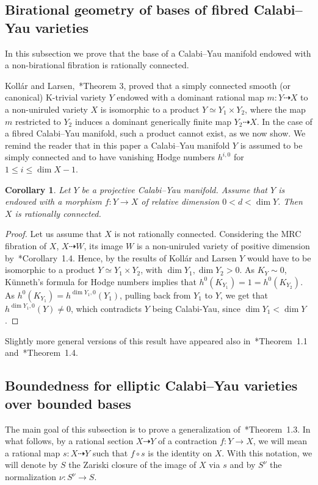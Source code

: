 \documentclass[11pt]{ip-journal}
\newtheorem{corollary}[theorem]{Corollary}
\theoremstyle{definition}
\begin{document}
\subsection{Birational geometry of bases of fibred Calabi--Yau varieties} \label{base.simply.cy.sect}

In this subsection we prove that the base of a Calabi--Yau manifold endowed with a non-birational fibration is rationally connected.

Koll\'ar and Larsen,~\cite{MR2641190}*{Theorem 3}, proved that a simply connected  smooth (or canonical) K-trivial variety $Y$ endowed with a dominant rational map $m \colon Y \dashrightarrow X$ to a non-uniruled variety $X$ is isomorphic to a product $Y \simeq Y_1 \times Y_2$, where the map $m$ restricted to $Y_2$ induces a dominant generically finite map 
$Y_2 \dashrightarrow X$.
In the case of a fibred Calabi--Yau manifold, such a product cannot exist, as we now show.
We remind the reader that in this paper a Calabi--Yau manifold 
$Y$ 
is assumed to be simply connected and to have vanishing Hodge numbers 
$h^{i, 0}$ 
for 
$1 \leq i \leq \dim X -1$.

\begin{corollary}\label{rc.base.cor}
Let $Y$ be a projective Calabi--Yau manifold. 
Assume that $Y$ is endowed with a morphism $f \colon Y \to X$ of relative dimension $0< d < \dim Y$.
Then $X$ is rationally connected.
\end{corollary}

\begin{proof}
Let us assume that 
$X$ 
is not rationally connected. 
Considering the MRC fibration of 
$X$, 
$X \dashrightarrow W$, 
its image 
$W$ 
is a non-uniruled variety of positive dimension by~\cite{GHS}*{Corollary~1.4}.
Hence, by the results of Koll\'ar and Larsen 
$Y$ 
would have to be isomorphic to a product 
$Y \simeq Y_1 \times Y_2$, 
with 
$\dim Y_1, \dim Y_2 >0$. 
As 
$K_Y\sim 0$, 
K\"unneth's formula for Hodge numbers implies that 
$h^0(K_{Y_1})=1=h^0(K_{Y_2})$.
As 
$h^0(K_{Y_1})=h^{\dim Y_1, 0}(Y_1)$, 
pulling back from 
$Y_1$ 
to 
$Y$, 
we get that 
$h^{\dim Y_1, 0}(Y) \neq 0$, 
which contradicts 
$Y$ 
being Calabi-Yau, since 
$\dim Y_1 < \dim Y$.
\end{proof}

Slightly more general versions of this result have appeared also in~\cite{1808.01115}*{Theorem~1.1} and~\cite{Lin20}*{Theorem~1.4}.

\subsection{Boundedness for elliptic Calabi--Yau varieties over bounded bases}
The main goal of this subsection is to prove a generalization of~\cite{DCS}*{Theorem~1.3}.
In what follows, by a rational section $X \dashrightarrow Y$ of a contraction $f\colon Y \to X$, we will mean a rational map $s \colon X \dashrightarrow Y$ such that $f \circ s$ is the identity on $X$.
With this notation, we will denote by $S$ the Zariski closure of the image of $X$ via $s$ and by $S^\nu$ the normalization $\nu \colon S^\nu \to S$.
\end{document}
